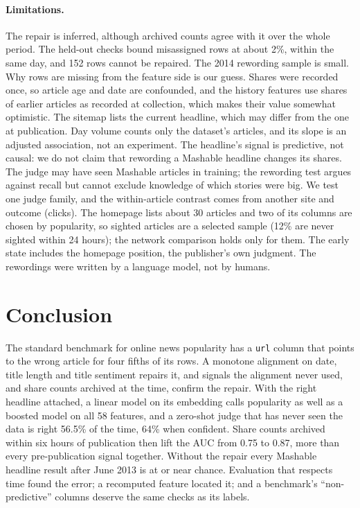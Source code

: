\documentclass[10pt,a4paper,twocolumn]{article}
\begin{document}
\paragraph{Limitations.} The repair is inferred, although archived counts agree with it over the whole period. The held-out checks bound misassigned rows at about 2\%, within the same day, and 152 rows cannot be repaired. The 2014 rewording sample is small. Why rows are missing from the feature side is
our guess. Shares were recorded once, so article age and date are confounded, and the history features use
shares of earlier articles as recorded at collection, which makes their value somewhat optimistic. The sitemap
lists the current headline, which may differ from the one at publication. Day volume counts only the dataset's articles, and its slope is an adjusted association, not an experiment. The headline's signal is predictive,
not causal: we do not claim that rewording a Mashable
headline changes its shares. The judge may have seen Mashable articles in training; the rewording test argues against recall but cannot exclude knowledge of which stories were big. We test one judge family, and the within-article contrast comes from another site and outcome (clicks). The homepage lists about 30 articles and two of its columns are chosen by popularity, so sighted articles are a selected sample (12\% are never sighted within 24 hours); the network comparison holds only for them. The early state includes the homepage position, the publisher's own judgment. The
rewordings were written by a language model, not by humans.

\section{Conclusion}
The standard benchmark for online news popularity has a \texttt{url} column that points to the wrong article for
four fifths of its rows. A monotone alignment on date, title length and title sentiment repairs it, and signals
the alignment never used, and share counts archived at the time, confirm the repair. With the right headline attached, a linear model on its embedding
calls popularity as well as a boosted model on all 58 features, and a zero-shot judge that has never seen the data is right 56.5\% of the time, 64\% when
confident. Share counts archived within six hours of publication then lift the AUC from 0.75 to 0.87, more than every pre-publication signal together. Without the repair every Mashable headline result after June 2013 is at or near chance. Evaluation that respects time found the error; a recomputed feature located it; and a benchmark's
``non-predictive'' columns deserve the same checks as its labels.

\setlength{\bibsep}{0pt}\renewcommand{\bibfont}{\scriptsize}


\end{document}
